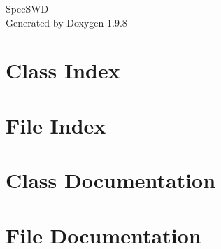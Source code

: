 \documentclass[twoside]{book}
\newcommand{\+}{\discretionary{\mbox{\scriptsize$\hookleftarrow$}}{}{}}
\newcommand{\clearemptydoublepage}{%
    \newpage{\pagestyle{empty}\cleardoublepage}%
  }
\begin{document}
  \raggedbottom
    \hypersetup{pageanchor=false,
                bookmarksnumbered=true,
                pdfencoding=unicode
               }
  \begin{titlepage}
  \vspace*{7cm}
  \begin{center}%
  {\Large Spec\+SWD}\\
  \vspace*{1cm}
  {\large Generated by Doxygen 1.9.8}\\
  \end{center}
  \end{titlepage}
  \clearemptydoublepage
  \tableofcontents
  \clearemptydoublepage
  \hypersetup{pageanchor=true}
\chapter{Class Index}

\chapter{File Index}

\chapter{Class Documentation}



\chapter{File Documentation}









  \backmatter
  \newpage
  \clearemptydoublepage
  \printindex
\end{document}
